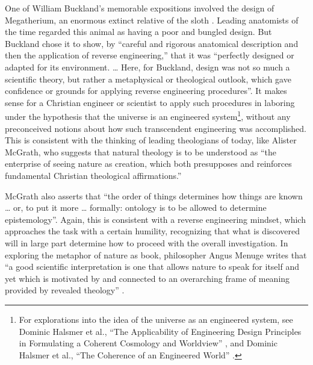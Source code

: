 One of William Buckland’s memorable expositions involved the design of
Megatherium, an enormous extinct relative of the
sloth \citep[][p.~245]{roberts1999}.
Leading anatomists of the time regarded this
animal as having a poor and bungled design. But Buckland chose it to
show, by ``careful and rigorous anatomical description and then the
application of reverse engineering,'' that it was ``perfectly designed or
adapted for its environment. {\ldots} Here, for Buckland, design was not so much
a scientific theory, but rather a metaphysical or theological outlook,
which gave confidence or grounds for applying reverse engineering
procedures''\citep[][p.~248]{roberts1999}.
It makes sense for a Christian
engineer or scientist to apply such procedures in laboring under the
hypothesis that the universe is an engineered
system\footnote{%
For explorations into the idea of the universe as an
engineered system, see Dominic Halsmer et al., ``The Applicability of
Engineering Design Principles in Formulating a Coherent Cosmology and
Worldview'' , and Dominic Halsmer et al., ``The Coherence of an
Engineered World'' .
}, without any preconceived notions about how
such transcendent engineering was accomplished. This is consistent with
the thinking of leading theologians of today, like Alister McGrath, who
suggests that natural theology is to be understood as ``the enterprise of
seeing nature as creation, which both presupposes and reinforces
fundamental Christian theological affirmations.''\citep[][p.~64]{mcgrath2006}

McGrath also asserts that ``the order of things determines how things are
known {\ldots} or, to put it more {\ldots} formally: ontology is to be allowed to
determine epistemology''\citep[][pp. xv--xvi]{mcgrath2006}. Again, this is consistent
with a reverse engineering mindset, which approaches the task with a
certain humility, recognizing that what is discovered will in large
part determine how to proceed with the overall investigation. In
exploring the metaphor of nature as book, philosopher Angus Menuge
writes that ``a good scientific interpretation is one that allows nature
to speak for itself and yet which is motivated by and connected to an
overarching frame of meaning provided by revealed
theology'' \citep[][p.~96]{menuge2003}.


